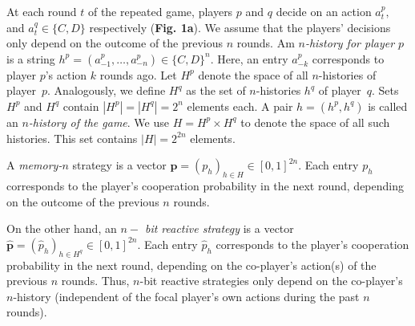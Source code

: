 \documentclass{article}
\theoremstyle{definition}
\begin{document}
At each round \(t\) of the repeated game, players \(p\) and \(q\) decide on an
action \(a^{p}_{t},\) and \(a^{q}_{t} \in \{C, D\}\) respectively (\textbf{Fig.
1a}). We assume that the players' decisions only depend on the outcome of the
previous \(n\) rounds. Am {\it $n$-history for player $p$} is a string
$h^p=(a^p_{-1},\ldots,a^p_{-n})\!\in\!\{C,D\}^n$. Here, an entry $a^p_{-k}$
corresponds to player $p$'s action $k$ rounds ago. Let $H^p$ denote the space of
all $n$-histories of player~$p$. Analogously, we define $H^q$ as the set of
$n$-histories $h^q$ of player~$q$. Sets $H^p$ and $H^q$ contain
$|H^p|=|H^q|=2^{n}$ elements each. A pair $h\!=\!(h^p,h^q)$ is called an {\it
$n$-history of the game}. We use $H=H^p\times H^q$ to denote the space of all
such histories. This set contains $|H|=2^{2n}$ elements.

A {\it memory-$n$} strategy is a vector $\mathbf{p}=(p_h)_{h\in
H}\in[0,1]^{2n}$. Each entry $p_h$ corresponds to the player's cooperation
probability in the next round, depending on the outcome of the previous $n$
rounds.

On the other hand, an {\it $n-$ bit reactive strategy} is a vector
$\mathbf{\hat{p}}=(\hat{p}_h)_{h\in H^q}\in[0,1]^{2n}$. Each entry $\hat{p}_h$
corresponds to the player's cooperation probability in the next round,
depending on the co-player's action(s) of the previous \(n\) rounds. Thus,
\(n\)-bit reactive strategies only depend on the co-player's \(n\)-history
(independent of the focal player's own actions during the past \(n\) rounds).
\end{document}
